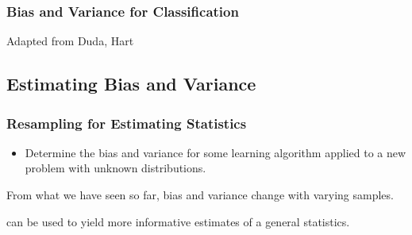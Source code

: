 \begin{frame}
  \frametitle{Bias and Variance for Classification \cont}

  \def\covA{\mat{\Sigma}_i = \left(\begin{matrix} \sigma^2_{i1} & \sigma_{i12} \\ \sigma_{i12} & \sigma^2_{i2} \end{matrix}\right)}
  \def\covB{\mat{\Sigma}_i = \left(\begin{matrix} \sigma^2_{i1} & 0            \\ 0            & \sigma^2_{i2} \end{matrix}\right)}
  \def\covC{\mat{\Sigma}_i = \left(\begin{matrix} 1             & 0            \\ 0            & 1             \end{matrix}\right)}

  \begin{center}  
    \resizebox{\linewidth}{!}{
      
    }
  \end{center}
  \spread

  \tiny{Adapted from Duda, Hart}
\end{frame}



\subsection{Estimating Bias and Variance}

\begin{frame}
  \frametitle{Resampling for Estimating Statistics}

  
  \begin{itemize}
    \item Determine the bias and variance for some learning algorithm applied to a new problem with unknown distributions.
  \end{itemize}
  \pspread

  From what we have seen so far, bias and variance change with varying samples.
  \pspread

   can be used to yield more informative estimates of a general statistics.
\end{frame}


